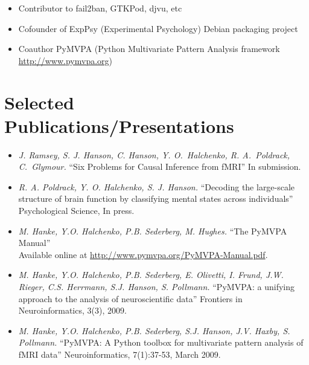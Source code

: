 \documentclass[12pt,overlapped,line]{res}
\newcommand{\mtitle}[1]{``#1''}
\newcommand{\mauthors}[1]{ \textit{#1.}}
\newcommand{\mwhere}[1]{#1.}
\begin{document}
\begin{resume}
\begin{description}
\begin{itemize}
      \item Contributor to fail2ban, GTKPod, djvu, etc

      \item Cofounder of ExpPsy (Experimental Psychology) Debian
        packaging project

      \item Coauthor PyMVPA (Python Multivariate Pattern Analysis
        framework \\ \url{http://www.pymvpa.org})

    \end{itemize}
  \end{description}

 \section{Selected Publications/Presentations}

 \begin{itemize}

 \item
   \mauthors{J. Ramsey, S. J. Hanson, C. Hanson, Y. O.~Halchenko,
     R. A.~Poldrack, C.~Glymour}
   \mtitle{Six Problems for Causal Inference from fMRI}
   \mwhere{In submission}

 \item
   \mauthors{R. A. Poldrack, Y. O. Halchenko, S. J. Hanson}
   \mtitle{Decoding the large-scale structure of brain function by
     classifying mental states across individuals}
   \mwhere{Psychological Science, In press}

  \item
    \mauthors{M. Hanke, Y.O. Halchenko, P.B. Sederberg, M. Hughes}
    \mtitle{The PyMVPA Manual}
    \mwhere{\\Available online at \url{http://www.pymvpa.org/PyMVPA-Manual.pdf}}

 \item
   \mauthors{ M. Hanke, Y.O. Halchenko, P.B. Sederberg, E. Olivetti, I. Frund, J.W. Rieger, C.S. Herrmann, S.J. Hanson, S. Pollmann}
    \mtitle{PyMVPA: a unifying approach to the analysis of neuroscientific data}
    \mwhere{Frontiers in Neuroinformatics, 3(3), 2009}

  \item
    \mauthors{M. Hanke, Y.O. Halchenko, P.B. Sederberg, S.J. Hanson, J.V. Haxby, S. Pollmann}
    \mtitle{PyMVPA: A Python toolbox for multivariate pattern analysis of fMRI data}
    \mwhere{Neuroinformatics, 7(1):37-53, March 2009}


\end{itemize}
\end{resume}
\end{document}
